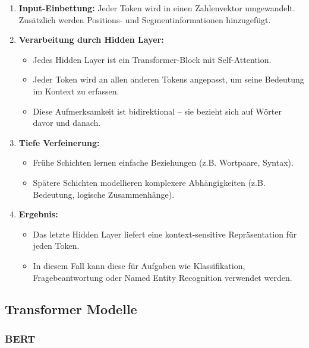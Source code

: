 \begin{enumerate}
    \item \textbf{Input-Einbettung:} Jeder Token wird in einen Zahlenvektor umgewandelt. 
    Zusätzlich werden Positions- und Segmentinformationen hinzugefügt.
    
    \item \textbf{Verarbeitung durch Hidden Layer:} 
    \begin{itemize}
        \item Jedes Hidden Layer ist ein Transformer-Block mit Self-Attention.
        \item Jeder Token wird an allen anderen Tokens angepasst, um seine Bedeutung im Kontext zu erfassen.
        \item Diese Aufmerksamkeit ist bidirektional – sie bezieht sich auf Wörter davor und danach.
    \end{itemize}
    
    \item \textbf{Tiefe Verfeinerung:} 
    \begin{itemize}
        \item Frühe Schichten lernen einfache Beziehungen (z.B. Wortpaare, Syntax).
        \item Spätere Schichten modellieren komplexere Abhängigkeiten (z.B. Bedeutung, logische Zusammenhänge).
    \end{itemize}
    
    \item \textbf{Ergebnis:} 
    \begin{itemize}
        \item Das letzte Hidden Layer liefert eine kontext-sensitive Repräsentation für jeden Token.
        \item In diesem Fall kann diese für Aufgaben wie Klassifikation, Fragebeantwortung oder Named Entity Recognition verwendet werden.
    \end{itemize}
\end{enumerate} 


\subsection{Transformer Modelle}
\label{sec:transformer_modelle}

\subsubsection{BERT} \label{sec04:bert}

